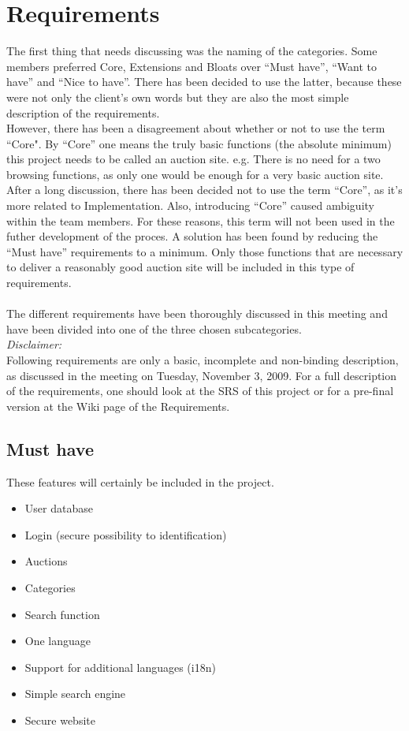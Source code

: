 \documentclass[a4paper, 12pt]{article}
\begin{document}
	\section{Requirements}
The first thing that needs discussing was the naming of the categories. Some members preferred Core, Extensions and Bloats over ``Must have'', ``Want to have'' and ``Nice to have''. There has been decided to use the latter, because these were not only the client's own words but they are also the most simple description of the requirements.\\However, there has been a disagreement about whether or not to use the term ``Core". By ``Core'' one means the truly basic functions (the absolute minimum) this project needs to be called an auction site. e.g. There is no need for a two browsing functions, as only one would be enough for a very basic auction site. After a long discussion, there has been decided not to use the term ``Core'', as it's more related to Implementation. Also, introducing ``Core'' caused ambiguity within the team members. For these reasons, this term will not been used in the futher development of the proces. A solution has been found by reducing the ``Must have'' requirements to a minimum. Only those functions that are necessary to  deliver a reasonably good auction site will be included in this type of requirements.
\\ \\
The different requirements have been thoroughly discussed in this meeting and have been divided into one of the three chosen subcategories.\\ \textit{Disclaimer:}\\
Following requirements are only a basic, incomplete and non-binding description, as discussed in the meeting on Tuesday, November 3, 2009. For a full description of the requirements, one should look at the SRS of this project or for a pre-final version at the Wiki page of the Requirements\cite{site1}.

		\subsection{Must have}
These features will certainly be included in the project.
			\begin{itemize}
				\item User database
				\item Login (secure possibility to identification)
				\item Auctions
				\item Categories
				\item Search function
				\item One language
				\item Support for additional languages (i18n)
				\item Simple search engine
				\item Secure website
			\end{itemize}
	
\end{document}
